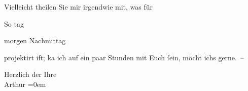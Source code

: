 \pstart
           {\pb}
               Vielleicht theilen Sie mir irgendwie mit, was für
                     
               
                  So
                  {\geminationn}
                  tag
               
                morgen 
               Nachmittag
               
               projektirt ift; ka
               {\geminationn}
                ich auf ein paar Stunden mit Euch
               ſein, möcht ichs gerne. –
            \pend
           
\pstart
           
               Herzlich der Ihre
               {\\[\baselineskip]}\spacefill\mbox{Arthur}\pend
           \leftskip=0em{}\endnumbering{}  
      